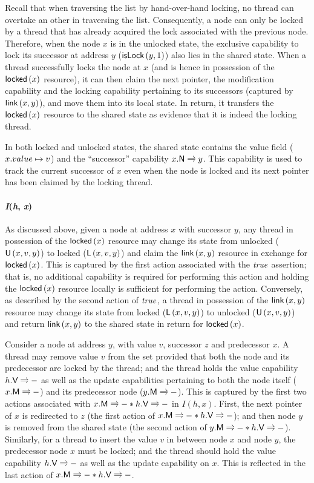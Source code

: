 %
Recall that when traversing the list by hand-over-hand locking, no thread can overtake an other in traversing the list. Consequently, a node can only be locked by a thread that has already acquired the lock associated with the previous node. Therefore, when the node $x$ is in the unlocked state, the exclusive capability to lock its successor at address $y$ ($\textsf{isLock}\left(y, 1\right)$) also lies in the shared state.
%
When a thread successfully locks the node at $x$ (and is hence in possession of the $\textsf{locked}\left(x \right)$ resource), it can then claim the next pointer, the modification capability and the locking capability pertaining to its successors (captured by $\textsf{link}\left(x, y \right)$), and move them into its local state. In return, it transfers the $\textsf{locked}\left(x \right)$ resource to the shared state as evidence that it is indeed the locking thread.

In both locked and unlocked states, the shared state contains the value field ($x.value \mapsto v$) and the ``successor'' capability $\nextC{x}{y}$. This capability is used to track the current successor of $x$ even when the node is locked and its next pointer has been claimed by the locking thread. 

\paragraph{\textbf{\textit{I}\textsf{(}\textit{h}, \textit{x}\textsf{)}}} As discussed above, given a node at address $x$ with successor $y$, any thread in possession of the $\textsf{locked}\left(x \right)$ resource may change its state from unlocked ($\textsf{U}\left(x, v, y\right)$) to locked ($\textsf{L}\left(x, v, y\right)$) and claim the $\textsf{link}\left(x, y \right)$ resource in exchange for $\textsf{locked}\left(x \right)$. This is captured by the first action associated with the $\mathit{true}$ assertion; that is, no additional capability is required for performing this action and holding the $\textsf{locked}\left(x \right)$ resource locally is sufficient for performing the action. Conversely, as described by the second action of $\mathit{true}$, a thread in possession of the $\textsf{link}\left(x, y \right)$ resource may change its state from locked ($\textsf{L}\left(x, v, y\right)$) to unlocked ($\textsf{U}\left(x, v, y\right)$) and return $\textsf{link}\left(x, y \right)$ to the shared state in return for $\textsf{locked}\left(x \right)$. 

Consider a node at address $y$, with value $v$, successor $z$ and predecessor $x$. A thread may remove value $v$ from the set provided that both the node and its predecessor are locked by the thread; and the thread holds the value capability $\valueC{h}{v}$ as well as the update capabilities pertaining to both the node itself ($\modC{x}$) and its predecessor node ($\modC{y}$). This is captured by the first two actions associated with $\modC{x} * \valueC{h}{v}$ in $I(h, x)$. First, the next pointer of $x$ is redirected to $z$ (the first action of $\modC{x} * \valueC{h}{v}$); and then node $y$ is removed from the shared state (the second action of $\modC{y} * \valueC{h}{v}$).
Similarly, for a thread to insert the value $v$ in between node $x$ and node $y$, the predecessor node $x$ must be locked; and the thread should hold the value capability $\valueC{h}{v}$ as well as the update capability on $x$. This is reflected in the last action of $\modC{x} * \valueC{h}{v}$.

